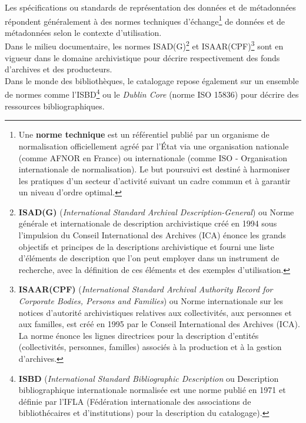Les spécifications ou standards de représentation des données et de métadonnées répondent généralement à des normes techniques d'échange\footnote{Une \textbf{norme technique} est un référentiel publié par un organisme de normalisation officiellement agréé par l'État via une organisation nationale (comme AFNOR en France) ou internationale (comme ISO - Organisation internationale de normalisation). Le but poursuivi est destiné à harmoniser les pratiques d'un secteur d'activité suivant un cadre commun et à garantir un niveau d'ordre optimal.} de données et de métadonnées selon le contexte d'utilisation.\\

Dans le milieu documentaire, les normes ISAD(G)\footnote{\textbf{ISAD(G)} (\textit{International Standard Archival Description-General}) ou Norme générale et internationale de description archivistique créé en 1994 sous l'impulsion du Conseil International des Archives (ICA) énonce les grands objectifs et principes de la descriptions archivistique et fourni une liste d'éléments de description que l'on peut employer dans un instrument de recherche, avec la définition de ces éléments et des exemples d'utilisation.} et ISAAR(CPF)\footnote{\textbf{ISAAR(CPF)} (\textit{International Standard Archival Authority Record for Corporate Bodies, Persons and Families}) ou Norme internationale sur les notices d'autorité archivistiques relatives aux collectivités, aux personnes et aux familles, est créé en 1995 par le Conseil International des Archives (ICA). La norme énonce les lignes directrices pour la description d'entités (collectivités, personnes, familles) associés à la production et à la gestion d'archives.} sont en vigueur dans le domaine archivistique pour décrire respectivement des fonds d'archives et des producteurs.\\

Dans le monde des bibliothèques, le catalogage repose également sur un ensemble de normes comme l'ISBD\footnote{\textbf{ISBD} (\textit{International Standard Bibliographic Description} ou Description bibliographique internationale normalisée est une norme publié en 1971 et définie par l'IFLA (Fédération internationale des associations de bibliothécaires et d'institutions) pour la description du catalogage).} ou le \textit{Dublin Core} (norme ISO 15836) pour décrire des ressources bibliographiques.\\

